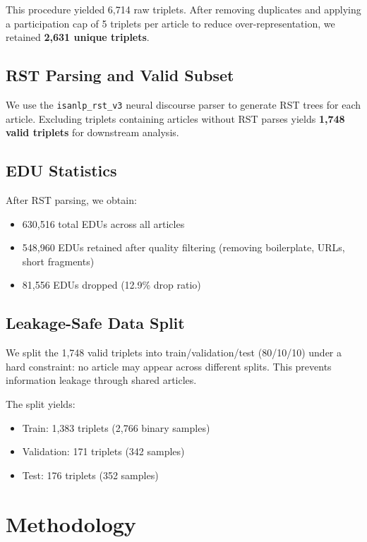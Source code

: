 \documentclass[11pt]{article}
\begin{document}
This procedure yielded 6,714 raw triplets. After removing duplicates and applying a participation cap of 5 triplets per article to reduce over-representation, we retained \textbf{2,631 unique triplets}.

\subsection{RST Parsing and Valid Subset}

We use the \texttt{isanlp\_rst\_v3} neural discourse parser to generate RST trees for each article. Excluding triplets containing articles without RST parses yields \textbf{1,748 valid triplets} for downstream analysis.

\subsection{EDU Statistics}

After RST parsing, we obtain:
\begin{itemize}
    \item 630,516 total EDUs across all articles
    \item 548,960 EDUs retained after quality filtering (removing boilerplate, URLs, short fragments)
    \item 81,556 EDUs dropped (12.9\% drop ratio)
\end{itemize}

\subsection{Leakage-Safe Data Split}

We split the 1,748 valid triplets into train/validation/test (80/10/10) under a hard constraint: no article may appear across different splits. This prevents information leakage through shared articles.

The split yields:
\begin{itemize}
    \item Train: 1,383 triplets (2,766 binary samples)
    \item Validation: 171 triplets (342 samples)
    \item Test: 176 triplets (352 samples)
\end{itemize}

\section{Methodology}
\end{document}
